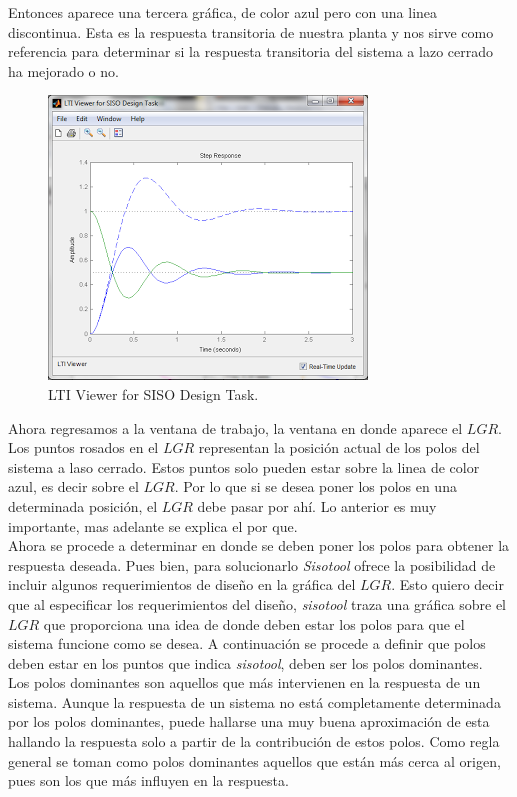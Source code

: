 \documentclass[a4paper,12pt,twoside]{proyectotanquesecci}
\begin{document}
Entonces aparece una tercera gráfica, de color azul pero con una linea discontinua. Esta es la respuesta transitoria de nuestra planta y nos sirve como referencia para determinar si la respuesta transitoria del sistema a lazo cerrado ha mejorado o no. \\

\begin{figure}[h]
\centering
\includegraphics[scale=0.7]{Ventana8}
\renewcommand{\figurename}{Fig.}
\caption{LTI Viewer for SISO Design Task.}
\label{LTI Viewer for SISO Design Task.}
\end{figure}

Ahora regresamos a la ventana de trabajo, la ventana en donde aparece el $LGR$. Los puntos rosados en el $LGR$ representan la posición actual de los polos del sistema a laso cerrado. Estos puntos solo pueden estar sobre la linea de color azul, es decir sobre el $LGR$. Por lo que si se desea poner los polos en una determinada posición, el $LGR$ debe pasar por ahí. Lo anterior es muy importante, mas adelante se explica el por que. \\

Ahora se procede a determinar en donde se deben poner los polos para obtener la respuesta deseada. Pues bien, para solucionarlo \textit{Sisotool} ofrece la posibilidad de incluir algunos requerimientos de diseño en la gráfica del $LGR$. Esto quiero decir que al especificar los requerimientos del diseño, \textit{sisotool} traza una gráfica sobre el $LGR$ que proporciona una idea de donde deben estar los polos para que el sistema funcione como se desea. A continuación se procede a definir que polos deben estar en los puntos que indica \textit{sisotool}, deben ser los polos dominantes. \\

Los polos dominantes son aquellos que más intervienen en la respuesta de un sistema. Aunque la respuesta de un sistema no está completamente determinada por los polos dominantes, puede hallarse una muy buena aproximación de esta hallando la respuesta solo a partir de la contribución de estos polos. Como regla general se toman como polos dominantes aquellos que están más cerca al origen, pues son los que más influyen en la respuesta. \\
\end{document}
